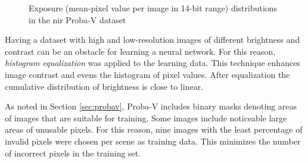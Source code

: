 \begin{figure}
        \centering
    \caption{Exposure (mean-pixel value per image in 14-bit range) distributions in the \gls{nir} Proba-V dataset}
    \label{fig:exposure-dist-nir}
\end{figure}

Having a dataset with high and low-resolution images of different brightness and contrast can be an obstacle for learning a neural network.
For this reason, \textit{histogram equalization} \cite{szeliski-2011-cv} was applied to the learning data.
This technique enhances image contrast and evens the histogram of pixel values.
After equalization the cumulative distribution of brightness is close to linear.

As noted in Section \ref{sec:probav}, Proba-V includes binary masks denoting areas of images that are suitable for training.
Some images include noticeable large areas of unusable pixels.
For this reason, nine images with the least percentage of invalid pixels were chosen per scene as training data.
This minimizes the number of incorrect pixels in the training set.

